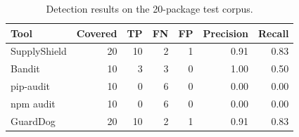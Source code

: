 \begin{table}[t]
\centering
\caption{Detection results on the 20-package test corpus.}
\label{tab:results}
\begin{tabular}{lrrrrrr}
\hline
Tool & Covered & TP & FN & FP & Precision & Recall \\
\hline
SupplyShield & 20 & 10 & 2 & 1 & 0.91 & 0.83 \\
Bandit & 10 & 3 & 3 & 0 & 1.00 & 0.50 \\
pip-audit & 10 & 0 & 6 & 0 & 0.00 & 0.00 \\
npm audit & 10 & 0 & 6 & 0 & 0.00 & 0.00 \\
GuardDog & 20 & 10 & 2 & 1 & 0.91 & 0.83 \\
\hline
\end{tabular}
\end{table}
